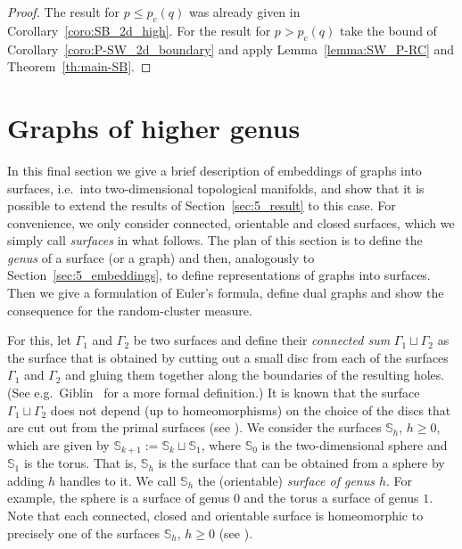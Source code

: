 \documentclass{dis}
\theoremstyle{citing}
\begin{document}
\begin{proof}
The result for $p\le p_c(q)$ was already given in 
Corollary~\ref{coro:SB_2d_high}. For the result for 
$p>p_c(q)$ take the bound of Corollary~\ref{coro:P-SW_2d_boundary} 
and apply Lemma~\ref{lemma:SW_P-RC} and Theorem~\ref{th:main-SB}.
\end{proof}

\vspace{2mm}

\section{Graphs of higher genus} \label{sec:5_genus}

In this final section we give a brief description of embeddings 
of graphs into surfaces, i.e.~into two-dimensional 
topological manifolds, and show that it is possible to extend 
the results of Section~\ref{sec:5_result} to this case. 
For convenience, we only consider connected, orientable and 
closed surfaces, which we simply call \emph{surfaces} in what follows.
The plan of this section is to define the \emph{genus} 
of a surface (or a graph) and then, analogously to 
Section~\ref{sec:5_embeddings}, to define representations of 
graphs into surfaces. Then we give a formulation of Euler's formula, 
define dual graphs and show the consequence 
for the random-cluster measure. 

For this, let ${\Gamma}_1$ and ${\Gamma}_2$ be two surfaces and define 
their \emph{connected sum} ${\Gamma}_1\sqcup{\Gamma}_2$ as the surface 
that is obtained by cutting out a small disc from each of 
the surfaces ${\Gamma}_1$ and ${\Gamma}_2$ and gluing them together 
along the boundaries of the resulting holes. 
(See e.g.~Giblin~\cite{Giblin} for a more formal definition.) 
It is known that the surface ${\Gamma}_1\sqcup{\Gamma}_2$ does not 
depend (up to homeomorphisms) on the choice of the discs that 
are cut out from the primal surfaces (see \cite[Prop.~2.17]{Giblin}). 
We consider the surfaces ${\ensuremath{\mathbb{S}}}_h$, $h\ge0$, which are 
given by ${\ensuremath{\mathbb{S}}}_{k+1}:={\ensuremath{\mathbb{S}}}_k\sqcup{\ensuremath{\mathbb{S}}}_1$, where 
${\ensuremath{\mathbb{S}}}_0$ is the two-dimensional sphere and ${\ensuremath{\mathbb{S}}}_1$ is the torus.
That is, ${\ensuremath{\mathbb{S}}}_h$ is the surface that can be obtained from a sphere 
by adding $h$ handles to it. We call ${\ensuremath{\mathbb{S}}}_h$ the (orientable) 
\emph{surface of genus $h$}. 
For example, the sphere is a surface of genus $0$ and the torus a 
surface of genus $1$. 
Note that each connected, closed and orientable surface is 
homeomorphic to precisely 
one of the surfaces ${\ensuremath{\mathbb{S}}}_h$, $h\ge0$ (see \cite[Thm.~3.1.3]{Mohar}).
\end{document}
